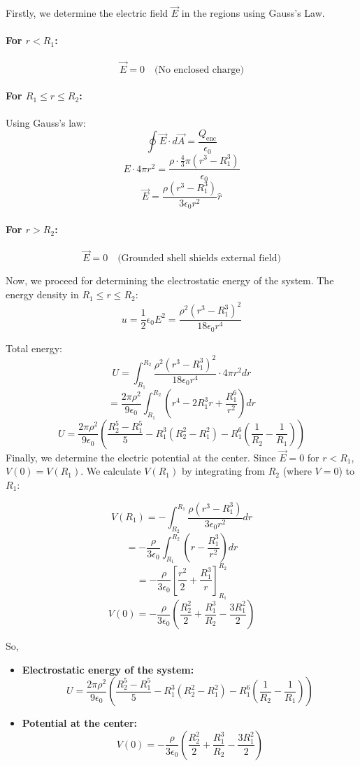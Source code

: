 \documentclass[a4paper]{article}
\begin{document}
\begin{tcolorbox}[
    title=Solution,
    colback=white,
    colframe=myblue,
    coltitle=black,
    fonttitle=\bfseries\large,
    breakable,
    enhanced,
    attach boxed title to top center={yshift=-2mm},
    boxed title style={colback=myblue!20, colframe=myblue}
]
Firstly, we determine the electric field $ \vec{E} $ in the regions using Gauss's Law.
\paragraph{For $r < R_1$:}
\[ \vec{E} = 0 \quad \text{(No enclosed charge)} \]

\paragraph{For $R_1 \leq r \leq R_2$:}
Using Gauss's law:
\[
\oint \vec{E} \cdot d\vec{A} = \frac{Q_{\text{enc}}}{\epsilon_0}
\]
\[
E \cdot 4\pi r^2 = \frac{\rho \cdot \frac{4}{3}\pi(r^3 - R_1^3)}{\epsilon_0}
\]
\[
\vec{E} = \frac{\rho(r^3 - R_1^3)}{3\epsilon_0 r^2}\hat{r}
\]

\paragraph{For $r > R_2$:}
\[ \vec{E} = 0 \quad \text{(Grounded shell shields external field)} \]

Now, we proceed for determining the electrostatic energy of the system.
The energy density in $R_1 \leq r \leq R_2$:
\[
u = \frac{1}{2}\epsilon_0 E^2 = \frac{\rho^2(r^3-R_1^3)^2}{18\epsilon_0 r^4}
\]

Total energy:
\[
U = \int_{R_1}^{R_2} \frac{\rho^2(r^3-R_1^3)^2}{18\epsilon_0 r^4} \cdot 4\pi r^2 dr
\]
\[
= \frac{2\pi\rho^2}{9\epsilon_0} \int_{R_1}^{R_2} \left(r^4 - 2R_1^3 r + \frac{R_1^6}{r^2}\right) dr
\]
\[
U = \boxed{\frac{2\pi\rho^2}{9\epsilon_0}\left(\frac{R_2^5-R_1^5}{5} - R_1^3(R_2^2-R_1^2) - R_1^6\left(\frac{1}{R_2}-\frac{1}{R_1}\right)\right)}
\]
Finally, we determine the electric potential at the center.
Since $\vec{E} = 0$ for $r < R_1$, $V(0) = V(R_1)$. We calculate $V(R_1)$ by integrating from $R_2$ (where $V=0$) to $R_1$:

\[
V(R_1) = -\int_{R_2}^{R_1} \frac{\rho(r^3 - R_1^3)}{3\epsilon_0 r^2} dr
\]
\[
= -\frac{\rho}{3\epsilon_0} \int_{R_1}^{R_2} \left(r - \frac{R_1^3}{r^2}\right) dr
\]
\[
= -\frac{\rho}{3\epsilon_0} \left[\frac{r^2}{2} + \frac{R_1^3}{r}\right]_{R_1}^{R_2}
\]
\[
V(0) = \boxed{-\frac{\rho}{3\epsilon_0}\left(\frac{R_2^2}{2} + \frac{R_1^3}{R_2} - \frac{3R_1^2}{2}\right)}
\]

So,
\begin{itemize}
   \item \textbf{Electrostatic energy of the system:}
\[
U = \boxed{\frac{2\pi\rho^2}{9\epsilon_0}\left(\frac{R_2^5-R_1^5}{5} - R_1^3(R_2^2-R_1^2) - R_1^6\left(\frac{1}{R_2}-\frac{1}{R_1}\right)\right)}
\]

\item \textbf{Potential at the center:}
\[
V(0) = \boxed{-\frac{\rho}{3\epsilon_0}\left(\frac{R_2^2}{2} + \frac{R_1^3}{R_2} - \frac{3R_1^2}{2}\right)}
\]
\end{itemize}
\end{tcolorbox}
\end{document}
